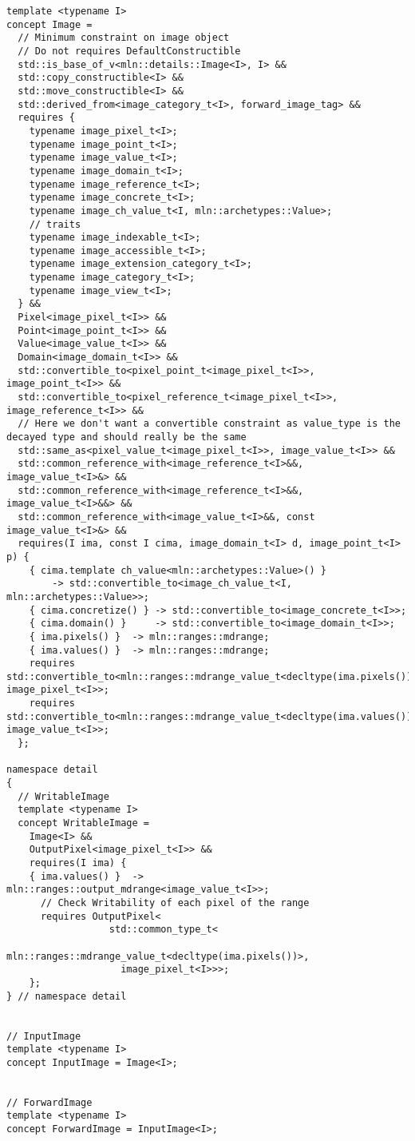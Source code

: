 \begin{verbatim}
template <typename I>
concept Image =
  // Minimum constraint on image object
  // Do not requires DefaultConstructible
  std::is_base_of_v<mln::details::Image<I>, I> &&
  std::copy_constructible<I> &&
  std::move_constructible<I> &&
  std::derived_from<image_category_t<I>, forward_image_tag> &&
  requires {
    typename image_pixel_t<I>;
    typename image_point_t<I>;
    typename image_value_t<I>;
    typename image_domain_t<I>;
    typename image_reference_t<I>;
    typename image_concrete_t<I>;
    typename image_ch_value_t<I, mln::archetypes::Value>;
    // traits
    typename image_indexable_t<I>;
    typename image_accessible_t<I>;
    typename image_extension_category_t<I>;
    typename image_category_t<I>;
    typename image_view_t<I>;
  } &&
  Pixel<image_pixel_t<I>> &&
  Point<image_point_t<I>> &&
  Value<image_value_t<I>> &&
  Domain<image_domain_t<I>> &&
  std::convertible_to<pixel_point_t<image_pixel_t<I>>, image_point_t<I>> &&
  std::convertible_to<pixel_reference_t<image_pixel_t<I>>, image_reference_t<I>> &&
  // Here we don't want a convertible constraint as value_type is the decayed type and should really be the same
  std::same_as<pixel_value_t<image_pixel_t<I>>, image_value_t<I>> &&
  std::common_reference_with<image_reference_t<I>&&, image_value_t<I>&> &&
  std::common_reference_with<image_reference_t<I>&&, image_value_t<I>&&> &&
  std::common_reference_with<image_value_t<I>&&, const image_value_t<I>&> &&
  requires(I ima, const I cima, image_domain_t<I> d, image_point_t<I> p) {
    { cima.template ch_value<mln::archetypes::Value>() }
        -> std::convertible_to<image_ch_value_t<I, mln::archetypes::Value>>;
    { cima.concretize() } -> std::convertible_to<image_concrete_t<I>>;
    { cima.domain() }     -> std::convertible_to<image_domain_t<I>>;
    { ima.pixels() }  -> mln::ranges::mdrange;
    { ima.values() }  -> mln::ranges::mdrange;
    requires std::convertible_to<mln::ranges::mdrange_value_t<decltype(ima.pixels())>, image_pixel_t<I>>;
    requires std::convertible_to<mln::ranges::mdrange_value_t<decltype(ima.values())>, image_value_t<I>>;
  };

namespace detail
{
  // WritableImage
  template <typename I>
  concept WritableImage =
    Image<I> &&
    OutputPixel<image_pixel_t<I>> &&
    requires(I ima) {
    { ima.values() }  -> mln::ranges::output_mdrange<image_value_t<I>>;
      // Check Writability of each pixel of the range
      requires OutputPixel<
                  std::common_type_t<
                    mln::ranges::mdrange_value_t<decltype(ima.pixels())>,
                    image_pixel_t<I>>>;
    };
} // namespace detail


// InputImage
template <typename I>
concept InputImage = Image<I>;


// ForwardImage
template <typename I>
concept ForwardImage = InputImage<I>;
\end{verbatim}


